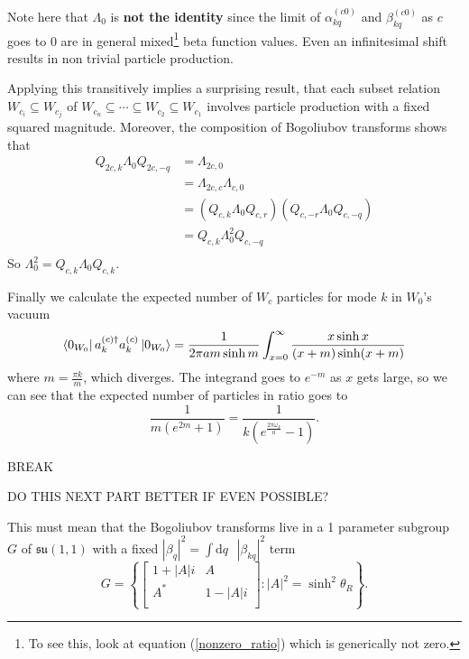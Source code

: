 \documentclass[12pt,a4paper]{article}
\newcommand{\dv}[1]{\mathrm{d} #1 \text{ }}
\begin{document}
Note here that $\Lambda_0$ is {\bf not the identity} since the limit of $\alpha_{kq}^{(c0)}$ and $\beta_{kq}^{(c0)}$ as $c$ goes to 0 are in general mixed\footnote{To see this, look at equation (\ref{nonzero_ratio}) which is generically not zero.} beta function values.  Even an infinitesimal shift results in non trivial particle production.

Applying this transitively implies a surprising result, that each subset relation $W_{c_i} \subseteq W_{c_j}$ of $W_{c_n} \subseteq \cdots \subseteq W_{c_2} \subseteq W_{c_1}$ involves particle production with a fixed squared magnitude. Moreover, the composition of Bogoliubov transforms shows that
\begin{equation}
  \begin{array}{ll}
  Q_{2c,k} \Lambda_0 Q_{2c,-q}  &= \Lambda_{2c,0} \\
  &= \Lambda_{2c,c} \Lambda_{c,0} \\
  &= \left( Q_{c,k} \Lambda_0 Q_{c,r} \right) \left( Q_{c,-r} \Lambda_0 Q_{c,-q}\right) \\
  &=  Q_{c,k} \Lambda_0^2 Q_{c,-q} \\
  \end{array}
\end{equation}
So $\Lambda_0^2 = Q_{c,k} \Lambda_0 Q_{c,k}$.

Finally we calculate the expected number of $W_c$ particles for mode $k$ in $W_0$'s vacuum
\begin{equation}
  \bra{0_{W_0}} a^{(c)\dagger}_k a^{(c)}_k \ket{0_{W_0}} = \frac{1}{2 \pi a m \sinh m} \int_{x=0}^\infty \frac{x \sinh x}{(x+m) \sinh(x+m)}
\end{equation}
where $m = \frac{\pi k}{m}$, which diverges.  The integrand goes to $e^{-m}$ as $x$ gets large, so we can see that the expected number of particles in ratio goes to
\begin{equation}
  \frac{1}{m (e^{2m} + 1)} = \frac{1}{k (e^{\frac{2\pi \omega_k}{a}} - 1)}.
\end{equation}

BREAK

DO THIS NEXT PART BETTER IF EVEN POSSIBLE?





This must mean that the Bogoliubov transforms live in a 1 parameter subgroup $G$ of $\mathfrak{su}(1,1)$ with a fixed $|\beta_q|^2 = \int \dv{q} \left|\beta_{kq}\right|^2$ term
\begin{equation}
  G = \left\{
  \begin{bmatrix}
    1 + |A|i & A \\
    A^* & 1 - |A|i \\
  \end{bmatrix} : |A|^2 = \sinh^2 \theta_R
  \right\}.
\end{equation}
\end{document}
